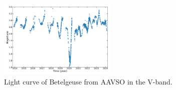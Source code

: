 \documentclass{aa}
\begin{document}

\begin{figure}[!h]
    \centering
    \includegraphics[width=0.5\textwidth]{Light_curve_Betelgeuse.png}
    \caption{Light curve of Betelgeuse from AAVSO in the V-band.}
    \label{light curve Betelgeuse}
\end{figure}

\end{document}
